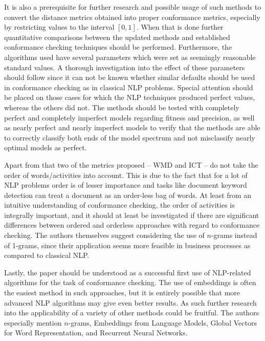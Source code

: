 \documentclass[runningheads]{template/llncs}
\begin{document}
It is also a  prerequisite for further research and possible usage of such methods to convert the distance metrics obtained into proper conformance metrics, especially by restricting values to the interval $[0,1]$.
When that is done further quantitative comparisons between the updated methods and established conformance checking techniques should be performed.
Furthermore, the algorithms used have several parameters which were set as seemingly reasonable standard values.
A thorough investigation into the effect of these parameters should follow since it can not be known whether similar defaults should be used in conformance checking  as in classical NLP problems.
Special attention should be placed on those cases for which the NLP techniques produced perfect values, whereas the others did not.
The methods should be tested with completely perfect and completely imperfect models regarding fitness and precision, as well as nearly perfect and nearly imperfect models to verify that the methods are able to correctly classify both ends of the model spectrum and not misclassify nearly optimal models as perfect.

Apart from that two of the metrics proposed -- WMD and ICT -- do not take the order of words/activities into account.
This is due to the fact that for a lot of NLP problems order is of lesser importance and tasks like document keyword detection can treat a document as an order-less bag of words.
At least from an intuitive understanding of conformance checking, the order of activities is integrally important, and it should at least be investigated if there are significant differences between ordered and orderless approaches with regard to conformance checking.
The authors themselves suggest considering the use of $n$-grams instead of 1-grams, since their application seems more feasible in business processes as compared to classical NLP.

Lastly, the paper should be understood as a successful first use of NLP-related algorithms for the task of conformance checking.
The use of embeddings is often the easiest method in such approaches, but it is entirely possible that more advanced NLP algorithms may give even better results.
As such further research into the applicability of a variety of other methods could be fruitful.
The authors especially mention $n$-grams, Embeddings from Language Models, Global Vectors for Word Representation, and Recurrent Neural Networks.
\end{document}
